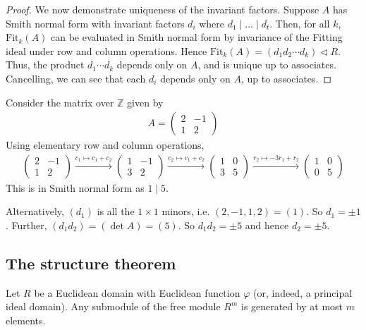 \begin{proof}
	We now demonstrate uniqueness of the invariant factors.
	Suppose $A$ has Smith normal form with invariant factors $d_i$ where $d_1 \mid \dots \mid d_t$.
	Then, for all $k$, $\mathrm{Fit}_k(A)$ can be evaluated in Smith normal form by invariance of the Fitting ideal under row and column operations.
	Hence $\mathrm{Fit}_k(A) = (d_1 d_2 \cdots d_k) \triangleleft R$.
	Thus, the product $d_1 \cdots d_k$ depends only on $A$, and is unique up to associates.
	Cancelling, we can see that each $d_i$ depends only on $A$, up to associates.
\end{proof}

\begin{example}
	Consider the matrix over $\mathbb Z$ given by
	\begin{align*}
		A = \begin{pmatrix}
			2 & -1 \\
			1 & 2
		\end{pmatrix}
	\end{align*}
	Using elementary row and column operations,
	\begin{align*}
		\begin{pmatrix}
			2 & -1 \\
			1 & 2
		\end{pmatrix} \xrightarrow{c_1 \mapsto c_1 + c_2} \begin{pmatrix}
			1 & -1 \\
			3 & 2
		\end{pmatrix} \xrightarrow{c_2 \mapsto c_1 + c_2} \begin{pmatrix}
			1 & 0 \\
			3 & 5
		\end{pmatrix} \xrightarrow{r_2 \mapsto -3r_1 + r_2} \begin{pmatrix}
			1 & 0 \\
			0 & 5
		\end{pmatrix}
	\end{align*}
	This is in Smith normal form as $1 \mid 5$.

	Alternatively, $(d_1)$ is all the $1 \times 1$ minors, i.e. $(2, -1, 1, 2) = (1)$.
	So $d_1 = \pm 1$.
	Further, $(d_1 d_2) = (\det A) = (5)$.
	So $d_1 d_2 = \pm 5$ and hence $d_2 = \pm 5$.
\end{example}

\subsection{The structure theorem}
\begin{lemma} \label{lem:16.3}
	Let $R$ be a Euclidean domain with Euclidean function $\varphi$ (or, indeed, a principal ideal domain).
	Any submodule of the free module $R^m$ is generated by at most $m$ elements.
\end{lemma}

